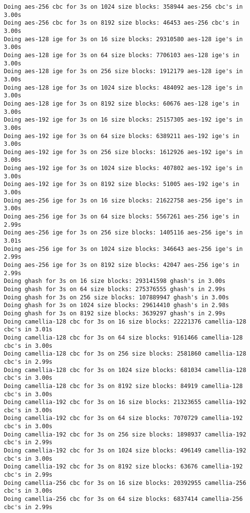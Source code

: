 \documentclass[%
 aip,
 jmp,%
 amsmath,amssymb,
 reprint,%
]{revtex4-1}
\begin{document}
\begin{verbatim}
Doing aes-256 cbc for 3s on 1024 size blocks: 358944 aes-256 cbc's in 3.00s
Doing aes-256 cbc for 3s on 8192 size blocks: 46453 aes-256 cbc's in 3.00s
Doing aes-128 ige for 3s on 16 size blocks: 29310580 aes-128 ige's in 3.00s
Doing aes-128 ige for 3s on 64 size blocks: 7706103 aes-128 ige's in 3.00s
Doing aes-128 ige for 3s on 256 size blocks: 1912179 aes-128 ige's in 3.00s
Doing aes-128 ige for 3s on 1024 size blocks: 484092 aes-128 ige's in 3.00s
Doing aes-128 ige for 3s on 8192 size blocks: 60676 aes-128 ige's in 3.00s
Doing aes-192 ige for 3s on 16 size blocks: 25157305 aes-192 ige's in 3.00s
Doing aes-192 ige for 3s on 64 size blocks: 6389211 aes-192 ige's in 3.00s
Doing aes-192 ige for 3s on 256 size blocks: 1612926 aes-192 ige's in 3.00s
Doing aes-192 ige for 3s on 1024 size blocks: 407802 aes-192 ige's in 3.00s
Doing aes-192 ige for 3s on 8192 size blocks: 51005 aes-192 ige's in 3.00s
Doing aes-256 ige for 3s on 16 size blocks: 21622758 aes-256 ige's in 3.00s
Doing aes-256 ige for 3s on 64 size blocks: 5567261 aes-256 ige's in 2.99s
Doing aes-256 ige for 3s on 256 size blocks: 1405116 aes-256 ige's in 3.01s
Doing aes-256 ige for 3s on 1024 size blocks: 346643 aes-256 ige's in 2.99s
Doing aes-256 ige for 3s on 8192 size blocks: 42047 aes-256 ige's in 2.99s
Doing ghash for 3s on 16 size blocks: 293141598 ghash's in 3.00s
Doing ghash for 3s on 64 size blocks: 275376555 ghash's in 2.99s
Doing ghash for 3s on 256 size blocks: 107889947 ghash's in 3.00s
Doing ghash for 3s on 1024 size blocks: 29614410 ghash's in 2.98s
Doing ghash for 3s on 8192 size blocks: 3639297 ghash's in 2.99s
Doing camellia-128 cbc for 3s on 16 size blocks: 22221376 camellia-128 cbc's in 3.01s
Doing camellia-128 cbc for 3s on 64 size blocks: 9161466 camellia-128 cbc's in 3.00s
Doing camellia-128 cbc for 3s on 256 size blocks: 2581860 camellia-128 cbc's in 2.99s
Doing camellia-128 cbc for 3s on 1024 size blocks: 681034 camellia-128 cbc's in 3.00s
Doing camellia-128 cbc for 3s on 8192 size blocks: 84919 camellia-128 cbc's in 3.00s
Doing camellia-192 cbc for 3s on 16 size blocks: 21323655 camellia-192 cbc's in 3.00s
Doing camellia-192 cbc for 3s on 64 size blocks: 7070729 camellia-192 cbc's in 3.00s
Doing camellia-192 cbc for 3s on 256 size blocks: 1898937 camellia-192 cbc's in 2.99s
Doing camellia-192 cbc for 3s on 1024 size blocks: 496149 camellia-192 cbc's in 3.00s
Doing camellia-192 cbc for 3s on 8192 size blocks: 63676 camellia-192 cbc's in 2.99s
Doing camellia-256 cbc for 3s on 16 size blocks: 20392955 camellia-256 cbc's in 3.00s
Doing camellia-256 cbc for 3s on 64 size blocks: 6837414 camellia-256 cbc's in 2.99s

\end{verbatim}
\end{document}
